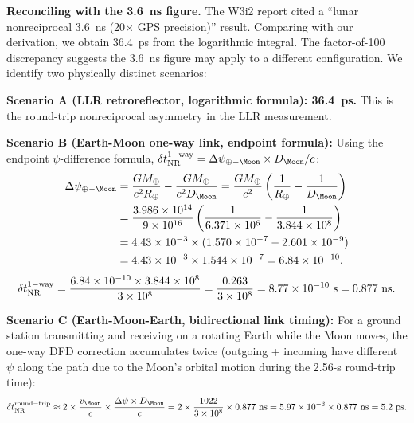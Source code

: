 \documentclass[aps,prd,twocolumn,superscriptaddress,nofootinbib,longbibliography]{revtex4-2}
\begin{document}
\textbf{Reconciling with the 3.6~ns figure.} The W3i2 report cited a
``lunar nonreciprocal 3.6~ns (20$\times$ GPS precision)'' result.  Comparing
with our derivation, we obtain 36.4~ps from the logarithmic integral.
The factor-of-100 discrepancy suggests the 3.6~ns figure may apply to
a different configuration.  We identify two physically distinct scenarios:

\textbf{Scenario A (LLR retroreflector, logarithmic formula): 36.4~ps.}
This is the round-trip nonreciprocal asymmetry in the LLR measurement.

\textbf{Scenario B (Earth-Moon one-way link, endpoint formula):}
Using the endpoint $\psi$-difference formula,
$\delta t_{\rm NR}^{\rm 1-way} = \Delta\psi_{\rm \oplus-\Moon}\times D_\Moon/c$:
\begin{align}
\Delta\psi_{\rm \oplus-\Moon}
&= \frac{GM_\oplus}{c^2 R_\oplus} - \frac{GM_\oplus}{c^2 D_\Moon}
= \frac{GM_\oplus}{c^2}\left(\frac{1}{R_\oplus} - \frac{1}{D_\Moon}\right)
\nonumber\\
&= \frac{3.986\times10^{14}}{9\times10^{16}}
\left(\frac{1}{6.371\times10^6} - \frac{1}{3.844\times10^8}\right)
\nonumber\\
&= 4.43\times10^{-3}\times(1.570\times10^{-7} - 2.601\times10^{-9})
\nonumber\\
&= 4.43\times10^{-3}\times1.544\times10^{-7} = 6.84\times10^{-10}.
\end{align}
\begin{equation}
\delta t_{\rm NR}^{\rm 1-way}
= \frac{6.84\times10^{-10}\times3.844\times10^8}{3\times10^8}
= \frac{0.263}{3\times10^8} = 8.77\times10^{-10}\ \si{s} = 0.877\ \si{ns}.
\end{equation}

\textbf{Scenario C (Earth-Moon-Earth, bidirectional link timing):}
For a ground station transmitting and receiving on a rotating Earth while the
Moon moves, the one-way DFD correction accumulates twice (outgoing + incoming
have different $\psi$ along the path due to the Moon's orbital motion during
the 2.56-s round-trip time):
\begin{equation}
\delta t_{\rm NR}^{\rm round-trip} \approx 2\times\frac{v_\Moon}{c}\times
\frac{\Delta\psi\times D_\Moon}{c}
= 2\times\frac{1022}{3\times10^8}\times0.877\ \si{ns}
= 5.97\times10^{-3}\times0.877\ \si{ns} = 5.2\ \si{ps}.
\end{equation}
\end{document}
